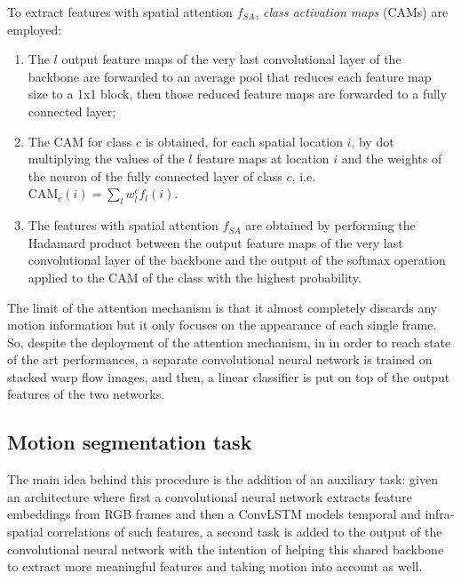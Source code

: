 \documentclass[10pt,twocolumn,letterpaper]{article}
\begin{document}
To extract features with spatial attention $f_{SA}$, \textit{class activation maps} (CAMs) are employed:
\begin{enumerate}
	\item The $l$ output feature maps of the very last convolutional layer of the backbone are forwarded to an average pool that reduces each feature map size to a 1x1 block, then those reduced feature maps are forwarded to a fully connected layer;
	\item The CAM for class $c$ is obtained, for each spatial location $i$, by dot multiplying the values of the $l$ feature maps at location $i$ and the weights of the neuron of the fully connected layer of class $c$, i.e. ${\text{CAM}_c(i) = \sum_l w_l^c f_l(i)}$. 
	\item The features with spatial attention $f_{SA}$ are obtained by performing the Hadamard product between the output feature maps of the very last convolutional layer of the backbone and the output of the softmax operation applied to the CAM of the class with the highest probability.
\end{enumerate}

The limit of the attention mechanism is that it almost completely discards any motion information but it only focuses on the appearance of each single frame. So, despite the deployment of the attention mechanism, in \cite{planamente2020joint} in order to reach state of the art performances, a separate convolutional neural network is trained on stacked warp flow images, and then, a linear classifier is put on top of the output features of the two networks.

\subsection{Motion segmentation task}
The main idea behind this procedure is the addition of an auxiliary task: given an architecture where first a convolutional neural network extracts feature embeddings from RGB frames and then a ConvLSTM models temporal and infra-spatial correlations of such features, a second task is added to the output of the convolutional neural network with the intention of helping this shared backbone to extract more meaningful features and taking motion into account as well.
\end{document}
